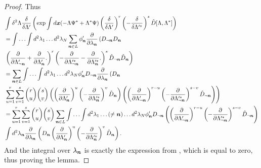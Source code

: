\begin{proof}
Thus
\begin{equation*}
\begin{split}
	& \int \delta^2\Lambda
		\frac{\delta}{\delta \Lambda^\prime} \left(
			\exp \int d\boldsymbol{x} (-\Lambda \Psi^* + \Lambda^* \Psi)
			\left( \frac{\delta}{\delta \Lambda^\prime} \right)^r
			\left( -\frac{\delta}{\delta \Lambda^{\prime*}} \right)^s
			\hat{D}[\Lambda, \Lambda^*]
		\right) \\
	& = \int \ldots \int d^2\lambda_1 \ldots d^2\lambda_N
		\sum\limits_{\boldsymbol{n} \in L}
		\phi_{\boldsymbol{n}}^\prime
		\frac{\partial}{\partial \lambda_{\boldsymbol{n}}} \left(
			D_{\lnot \boldsymbol{n}} D_{\boldsymbol{n}}
		\right.	\\
		& \left.
			\left(
				\frac{\partial}{\partial \Lambda_{\lnot \boldsymbol{n}}^\prime}
				+ \frac{\partial}{\partial \Lambda_{\boldsymbol{n}}^\prime}.
			\right)^r
			\left(
				-\frac{\partial}{\partial \Lambda_{\lnot \boldsymbol{n}}^{\prime*}}
				-\frac{\partial}{\partial \Lambda_{\boldsymbol{n}}^{\prime*}}.
			\right)^s
			\hat{D}_{\lnot \boldsymbol{n}} \hat{D}_{\boldsymbol{n}}
		\right) \\
	& = \sum\limits_{\boldsymbol{n} \in L} \int \ldots \int d^2\lambda_1 \ldots d^2\lambda_N
		\phi_{\boldsymbol{n}}^\prime D_{\lnot \boldsymbol{n}}
		\frac{\partial}{\partial \lambda_{\boldsymbol{n}}} \left(
			D_{\boldsymbol{n}}
		\right.	\\
	& \left.
		\sum\limits_{u=1}^r \sum\limits_{v=1}^s \binom{r}{u} \binom{s}{v}
			\left(
				\left( \frac{\partial}{\partial \Lambda_{\boldsymbol{n}}^\prime} \right)^u
				\left( -\frac{\partial}{\partial \Lambda_{\boldsymbol{n}}^{\prime*}} \right)^v
				\hat{D}_{\boldsymbol{n}}
			\right)
			\left(
				\left( \frac{\partial}{\partial \Lambda_{\lnot \boldsymbol{n}}^\prime} \right)^{r-u}
				\left( -\frac{\partial}{\partial \Lambda_{\lnot \boldsymbol{n}}^{\prime*}} \right)^{s-v}
				\hat{D}_{\lnot \boldsymbol{n}}
			\right)
		\right) \\
	& = \sum\limits_{u=1}^r \sum\limits_{v=1}^s \binom{r}{u} \binom{s}{v}
		\sum\limits_{\boldsymbol{n} \in L}
		\int \ldots \int d^2\lambda_1 \ldots (\ne \boldsymbol{n}) \ldots d^2\lambda_N
		\phi_{\boldsymbol{n}}^\prime D_{\lnot \boldsymbol{n}}
		\left(
			\left( \frac{\partial}{\partial \Lambda_{\lnot \boldsymbol{n}}^\prime} \right)^{r-u}
			\left( -\frac{\partial}{\partial \Lambda_{\lnot \boldsymbol{n}}^{\prime*}} \right)^{s-v}
			\hat{D}_{\lnot \boldsymbol{n}}
		\right) \\
	&	\int d^2\lambda_{\boldsymbol{n}} \frac{\partial}{\partial \lambda_{\boldsymbol{n}}} \left(
			D_{\boldsymbol{n}}
			\left( \frac{\partial}{\partial \Lambda_{\boldsymbol{n}}^\prime} \right)^u
			\left( -\frac{\partial}{\partial \Lambda_{\boldsymbol{n}}^{\prime*}} \right)^v
			\hat{D}_{\boldsymbol{n}}
		\right).
\end{split}
\end{equation*}
And the integral over $\lambda_{\boldsymbol{n}}$ is exactly the expression from ,
which is equal to zero,
thus proving the lemma.
\end{proof}

